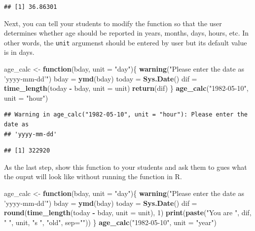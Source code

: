 \documentclass[]{book}
\newenvironment{Shaded}{\begin{snugshade}}{\end{snugshade}}
\newcommand{\ControlFlowTok}[1]{\textcolor[rgb]{0.13,0.29,0.53}{\textbf{#1}}}
\newcommand{\DataTypeTok}[1]{\textcolor[rgb]{0.13,0.29,0.53}{#1}}
\newcommand{\DecValTok}[1]{\textcolor[rgb]{0.00,0.00,0.81}{#1}}
\newcommand{\KeywordTok}[1]{\textcolor[rgb]{0.13,0.29,0.53}{\textbf{#1}}}
\newcommand{\NormalTok}[1]{#1}
\newcommand{\OperatorTok}[1]{\textcolor[rgb]{0.81,0.36,0.00}{\textbf{#1}}}
\newcommand{\StringTok}[1]{\textcolor[rgb]{0.31,0.60,0.02}{#1}}
\begin{document}
\begin{verbatim}
## [1] 36.86301
\end{verbatim}

Next, you can tell your students to modify the function so that the user determines whether age should be reported in years, months, days, hours, etc. In other words, the \texttt{unit} argumenst should be entered by user but its default value is in days.

\begin{Shaded}
\begin{Highlighting}[]
\NormalTok{age_calc <-}\StringTok{ }\ControlFlowTok{function}\NormalTok{(bday, }\DataTypeTok{unit =} \StringTok{"day"}\NormalTok{)\{}
    \KeywordTok{warning}\NormalTok{(}\StringTok{"Please enter the date as 'yyyy-mm-dd'"}\NormalTok{)}
\NormalTok{    bday =}\StringTok{ }\KeywordTok{ymd}\NormalTok{(bday)}
\NormalTok{    today =}\StringTok{ }\KeywordTok{Sys.Date}\NormalTok{()}
\NormalTok{    dif =}\StringTok{ }\KeywordTok{time_length}\NormalTok{(today }\OperatorTok{-}\StringTok{ }\NormalTok{bday, }\DataTypeTok{unit =}\NormalTok{ unit)}
    \KeywordTok{return}\NormalTok{(dif)}
\NormalTok{\}}
\KeywordTok{age_calc}\NormalTok{(}\StringTok{"1982-05-10"}\NormalTok{, }\DataTypeTok{unit =} \StringTok{"hour"}\NormalTok{)}
\end{Highlighting}
\end{Shaded}

\begin{verbatim}
## Warning in age_calc("1982-05-10", unit = "hour"): Please enter the date as
## 'yyyy-mm-dd'
\end{verbatim}

\begin{verbatim}
## [1] 322920
\end{verbatim}

As the last step, show this function to your students and ask them to gues what the ouput will look like without running the function in R.

\begin{Shaded}
\begin{Highlighting}[]
\NormalTok{age_calc <-}\StringTok{ }\ControlFlowTok{function}\NormalTok{(bday, }\DataTypeTok{unit =} \StringTok{"day"}\NormalTok{)\{}
    \KeywordTok{warning}\NormalTok{(}\StringTok{"Please enter the date as 'yyyy-mm-dd'"}\NormalTok{)}
\NormalTok{    bday =}\StringTok{ }\KeywordTok{ymd}\NormalTok{(bday)}
\NormalTok{    today =}\StringTok{ }\KeywordTok{Sys.Date}\NormalTok{()}
\NormalTok{    dif =}\StringTok{ }\KeywordTok{round}\NormalTok{(}\KeywordTok{time_length}\NormalTok{(today }\OperatorTok{-}\StringTok{ }\NormalTok{bday, }\DataTypeTok{unit =}\NormalTok{ unit), }\DecValTok{1}\NormalTok{)}
    \KeywordTok{print}\NormalTok{(}\KeywordTok{paste}\NormalTok{(}\StringTok{"You are "}\NormalTok{, dif, }\StringTok{" "}\NormalTok{, unit, }\StringTok{"s "}\NormalTok{, }\StringTok{"old"}\NormalTok{, }\DataTypeTok{sep=}\StringTok{""}\NormalTok{))}
\NormalTok{\}}
\KeywordTok{age_calc}\NormalTok{(}\StringTok{"1982-05-10"}\NormalTok{, }\DataTypeTok{unit =} \StringTok{"year"}\NormalTok{)}
\end{Highlighting}
\end{Shaded}
\end{document}
